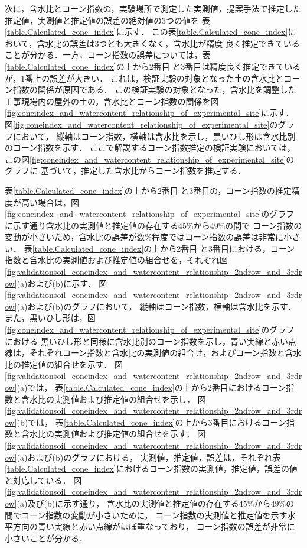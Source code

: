 \clearpage

次に，含水比とコーン指数の，実験場所で測定した実測値，提案手法で推定した推定値，実測値と推定値の誤差の絶対値の3つの値を
表\ref{table.Calculated_cone_index}に示す．
この表\ref{table.Calculated_cone_index}において，含水比の誤差は3つとも大きくなく，含水比が精度 
良く推定できていることが分かる．一方，コーン指数の誤差については，表\ref{table.Calculated_cone_index}の上から2番目 
と3番目は精度良く推定できているが，1番上の誤差が大きい．
これは，検証実験の対象となった土の含水比とコーン指数の関係が原因である．
この検証実験の対象となった，含水比を調整した工事現場内の屋外の土の，含水比とコーン指数の関係を図\ref{fig:coneindex_and_watercontent_relationship_of_experimental_site}に示す．
図\ref{fig:coneindex_and_watercontent_relationship_of_experimental_site}のグラフにおいて，
縦軸はコーン指数，横軸は含水比を示し，黒いひし形は含水比別のコーン指数を示す．
ここで解説するコーン指数推定の検証実験においては，この図\ref{fig:coneindex_and_watercontent_relationship_of_experimental_site}のグラフに
基づいて，推定した含水比からコーン指数を推定する．

表\ref{table.Calculated_cone_index}の上から2番目 
と3番目の，コーン指数の推定精度が高い場合は，図\ref{fig:coneindex_and_watercontent_relationship_of_experimental_site}のグラフに示す通り含水比の実測値と推定値の存在する45\%から49\%の間で
コーン指数の変動が小さいため，含水比の誤差が数\%程度ではコーン指数の誤差は非常に小さい．
表\ref{table.Calculated_cone_index}の上から2番目 
と3番目における，コーン指数と含水比の実測値および推定値の組合せを，それぞれ図\ref{fig:validationsoil_coneindex_and_watercontent_relationship_2ndrow_and_3rdrow}(a)および(b)に示す．
図\ref{fig:validationsoil_coneindex_and_watercontent_relationship_2ndrow_and_3rdrow}(a)および(b)のグラフにおいて，
縦軸はコーン指数，横軸は含水比を示す．
また，黒いひし形は，図\ref{fig:coneindex_and_watercontent_relationship_of_experimental_site}のグラフにおける
黒いひし形と同様に含水比別のコーン指数を示し，青い実線と赤い点線は，それぞれコーン指数と含水比の実測値の組合せ，およびコーン指数と含水比の推定値の組合せを示す．
図\ref{fig:validationsoil_coneindex_and_watercontent_relationship_2ndrow_and_3rdrow}(a)では，
表\ref{table.Calculated_cone_index}の上から2番目におけるコーン指数と含水比の実測値および推定値の組合せを示し，
図\ref{fig:validationsoil_coneindex_and_watercontent_relationship_2ndrow_and_3rdrow}(b)では，
表\ref{table.Calculated_cone_index}の上から3番目におけるコーン指数と含水比の実測値および推定値の組合せを示す．
図\ref{fig:validationsoil_coneindex_and_watercontent_relationship_2ndrow_and_3rdrow}(a)および(b)のグラフにおける，
実測値，推定値，誤差は，それぞれ表\ref{table.Calculated_cone_index}におけるコーン指数の実測値，推定値，誤差の値と対応している．
図\ref{fig:validationsoil_coneindex_and_watercontent_relationship_2ndrow_and_3rdrow}(a)及び(b)に示す通り，
含水比の実測値と推定値の存在する45\%から49\%の間でコーン指数の変動が小さいために，
コーン指数の実測値と推定値を示す水平方向の青い実線と赤い点線がほぼ重なっており，
コーン指数の誤差が非常に小さいことが分かる．

